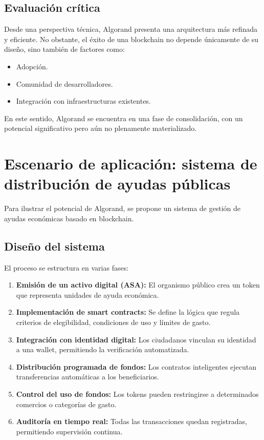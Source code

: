 \documentclass[12pt]{article}
\begin{document}
\subsection{Evaluación crítica}

Desde una perspectiva técnica, Algorand presenta una arquitectura más refinada y eficiente. No obstante, el éxito de una blockchain no depende únicamente de su diseño, sino también de factores como:
\begin{itemize}
    \item Adopción.
    \item Comunidad de desarrolladores.
    \item Integración con infraestructuras existentes.
\end{itemize}

En este sentido, Algorand se encuentra en una fase de consolidación, con un potencial significativo pero aún no plenamente materializado.

\section{Escenario de aplicación: sistema de distribución de ayudas públicas}

Para ilustrar el potencial de Algorand, se propone un sistema de gestión de ayudas económicas basado en blockchain.

\subsection{Diseño del sistema}

El proceso se estructura en varias fases:
\begin{enumerate}
    \item \textbf{Emisión de un activo digital (ASA):} El organismo público crea un token que representa unidades de ayuda económica.
    \item \textbf{Implementación de smart contracts:} Se define la lógica que regula criterios de elegibilidad, condiciones de uso y límites de gasto.
    \item \textbf{Integración con identidad digital:} Los ciudadanos vinculan su identidad a una wallet, permitiendo la verificación automatizada.
    \item \textbf{Distribución programada de fondos:} Los contratos inteligentes ejecutan transferencias automáticas a los beneficiarios.
    \item \textbf{Control del uso de fondos:} Los tokens pueden restringirse a determinados comercios o categorías de gasto.
    \item \textbf{Auditoría en tiempo real:} Todas las transacciones quedan registradas, permitiendo supervisión continua.
\end{enumerate}
\end{document}
